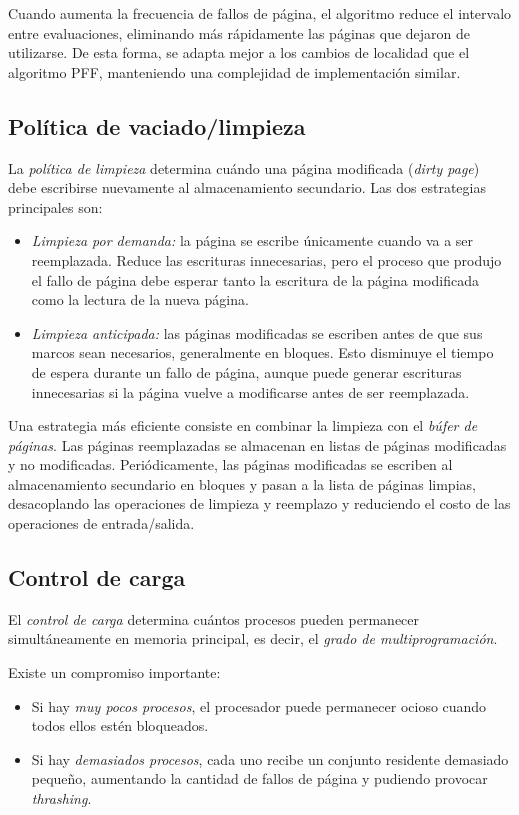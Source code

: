 Cuando aumenta la frecuencia de fallos de página, el algoritmo reduce el intervalo entre evaluaciones, eliminando más rápidamente las páginas que dejaron de utilizarse. De esta forma, se adapta mejor a los cambios de localidad que el algoritmo PFF, manteniendo una complejidad de implementación similar.

\subsection{Política de vaciado/limpieza}

La \textit{política de limpieza} determina cuándo una página modificada (\textit{dirty page}) debe escribirse nuevamente al almacenamiento secundario. Las dos estrategias principales son:
\begin{itemize}
  \item \textit{Limpieza por demanda:} la página se escribe únicamente cuando va a ser reemplazada. Reduce las escrituras innecesarias, pero el proceso que produjo el fallo de página debe esperar tanto la escritura de la página modificada como la lectura de la nueva página.

  \item \textit{Limpieza anticipada:} las páginas modificadas se escriben antes de que sus marcos sean necesarios, generalmente en bloques. Esto disminuye el tiempo de espera durante un fallo de página, aunque puede generar escrituras innecesarias si la página vuelve a modificarse antes de ser reemplazada.
\end{itemize}

Una estrategia más eficiente consiste en combinar la limpieza con el \textit{búfer de páginas}. Las páginas reemplazadas se almacenan en listas de páginas modificadas y no modificadas. Periódicamente, las páginas modificadas se escriben al almacenamiento secundario en bloques y pasan a la lista de páginas limpias, desacoplando las operaciones de limpieza y reemplazo y reduciendo el costo de las operaciones de entrada/salida.

\subsection{Control de carga}

El \textit{control de carga} determina cuántos procesos pueden permanecer simultáneamente en memoria principal, es decir, el \textit{grado de multiprogramación}.

Existe un compromiso importante:
\begin{itemize}
  \item Si hay \textit{muy pocos procesos}, el procesador puede permanecer ocioso cuando todos ellos estén bloqueados.
  \item Si hay \textit{demasiados procesos}, cada uno recibe un conjunto residente demasiado pequeño, aumentando la cantidad de fallos de página y pudiendo provocar \textit{thrashing}.
\end{itemize}

